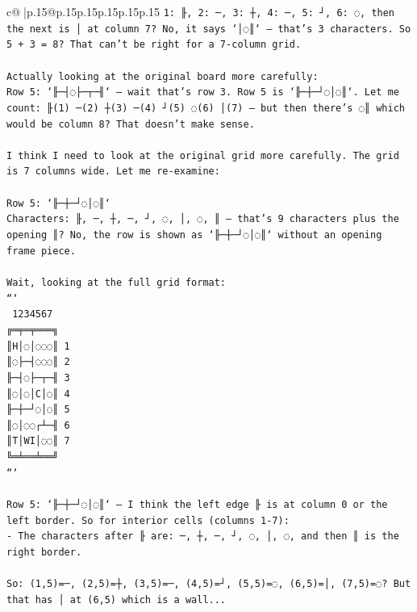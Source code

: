 \documentclass{article}
\begin{document}
{\begin{supertabular}{c@{$\;$}|p{.15\linewidth}@{}p{.15\linewidth}p{.15\linewidth}p{.15\linewidth}p{.15\linewidth}p{.15\linewidth}}
{{{\texttt{1: ╟, 2: ─, 3: ┼, 4: ─, 5: ┘, 6: ◌, then the next is │ at column 7? No, it says `│◌║` — that's 3 characters. So 5 + 3 = 8? That can't be right for a 7{-}column grid.} \\
\\ 
\texttt{Actually looking at the original board more carefully:} \\
\texttt{Row 5: `╟─┤◌├─┬─╢` — wait that's row 3. Row 5 is `╟─┼─┘◌│◌║`. Let me count: ╟(1) ─(2) ┼(3) ─(4) ┘(5) ◌(6) │(7) — but then there's ◌║ which would be column 8? That doesn't make sense.} \\
\\ 
\texttt{I think I need to look at the original grid more carefully. The grid is 7 columns wide. Let me re{-}examine:} \\
\\ 
\texttt{Row 5: `╟─┼─┘◌│◌║`} \\
\texttt{Characters: ╟, ─, ┼, ─, ┘, ◌, │, ◌, ║ — that's 9 characters plus the opening ║? No, the row is shown as `╟─┼─┘◌│◌║` without an opening frame piece.} \\
\\ 
\texttt{Wait, looking at the full grid format:} \\
\texttt{```} \\
\texttt{ 1234567} \\
\texttt{╔═╤═╤═══╗} \\
\texttt{║H│◌│◌◌◌║ 1} \\
\texttt{║◌├─┤◌◌◌║ 2} \\
\texttt{╟─┤◌├─┬─╢ 3} \\
\texttt{║◌│◌│C│◌║ 4} \\
\texttt{╟─┼─┘◌│◌║ 5} \\
\texttt{║◌│◌◌┌┴─╢ 6} \\
\texttt{║T│WI│◌◌║ 7} \\
\texttt{╚═╧══╧══╝} \\
\texttt{```} \\
\\ 
\texttt{Row 5: `╟─┼─┘◌│◌║` — I think the left edge ╟ is at column 0 or the left border. So for interior cells (columns 1{-}7):} \\
\texttt{{-} The characters after ╟ are: ─, ┼, ─, ┘, ◌, │, ◌, and then ║ is the right border.} \\
\\ 
\texttt{So: (1,5)=─, (2,5)=┼, (3,5)=─, (4,5)=┘, (5,5)=◌, (6,5)=│, (7,5)=◌? But that has │ at (6,5) which is a wall...} \\
\\ 
}}}
\end{supertabular}}
\end{document}
